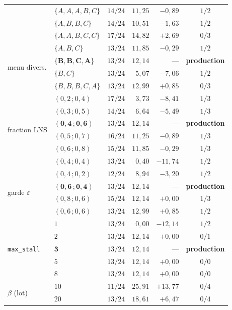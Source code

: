 \documentclass[11pt,a4paper]{article}
\theoremstyle{plain}
\theoremstyle{remark}
\begin{document}
\begin{table}[H]
\begin{tabular}{llrrrc}
 & $\{A,A,A,B,C\}$ & $14/24$ & $11{,}25$ & $-0{,}89$ & $1/2$\\
 & $\{A,B,B,C\}$ & $14/24$ & $10{,}51$ & $-1{,}63$ & $1/2$\\
 & $\{A,A,B,C,C\}$ & $17/24$ & $14{,}82$ & $+2{,}69$ & $0/3$\\
\midrule
\multirow{4}{*}{menu divers.}
 & $\{A,B,C\}$ & $13/24$ & $11{,}85$ & $-0{,}29$ & $1/2$\\
 & $\mathbf{\{B,B,C,A\}}$ & $13/24$ & $12{,}14$ & --- & \textbf{production}\\
 & $\{B,C\}$ & $13/24$ & $5{,}07$ & $-7{,}06$ & $1/2$\\
 & $\{B,B,B,C,A\}$ & $13/24$ & $12{,}99$ & $+0{,}85$ & $0/3$\\
\midrule
\multirow{6}{*}{fraction LNS}
 & $(0{,}2\,;0{,}4)$ & $17/24$ & $3{,}73$ & $-8{,}41$ & $1/3$\\
 & $(0{,}3\,;0{,}5)$ & $14/24$ & $6{,}64$ & $-5{,}49$ & $1/3$\\
 & $\mathbf{(0{,}4\,;0{,}6)}$ & $13/24$ & $12{,}14$ & --- & \textbf{production}\\
 & $(0{,}5\,;0{,}7)$ & $16/24$ & $11{,}25$ & $-0{,}89$ & $1/3$\\
 & $(0{,}6\,;0{,}8)$ & $15/24$ & $11{,}85$ & $-0{,}29$ & $1/3$\\
 & $(0{,}4\,;0{,}4)$ & $13/24$ & $0{,}40$ & $-11{,}74$ & $1/2$\\
\midrule
\multirow{4}{*}{garde $\varepsilon$}
 & $(0{,}4\,;0{,}2)$ & $12/24$ & $8{,}94$ & $-3{,}20$ & $1/2$\\
 & $\mathbf{(0{,}6\,;0{,}4)}$ & $13/24$ & $12{,}14$ & --- & \textbf{production}\\
 & $(0{,}8\,;0{,}6)$ & $15/24$ & $12{,}14$ & $+0{,}00$ & $1/3$\\
 & $(0{,}6\,;0{,}6)$ & $13/24$ & $12{,}99$ & $+0{,}85$ & $1/2$\\
\midrule
\multirow{5}{*}{\texttt{max\_stall}}
 & $1$ & $13/24$ & $0{,}00$ & $-12{,}14$ & $1/2$\\
 & $2$ & $13/24$ & $12{,}14$ & $+0{,}00$ & $0/1$\\
 & $\mathbf{3}$ & $13/24$ & $12{,}14$ & --- & \textbf{production}\\
 & $5$ & $13/24$ & $12{,}14$ & $+0{,}00$ & $0/0$\\
 & $8$ & $13/24$ & $12{,}14$ & $+0{,}00$ & $0/0$\\
\midrule
\multirow{5}{*}{$\beta$ (lot)}
 & $10$ & $11/24$ & $25{,}91$ & $+13{,}77$ & $0/4$\\
 & $20$ & $13/24$ & $18{,}61$ & $+6{,}47$ & $0/4$\\

\end{tabular}
\end{table}
\end{document}
